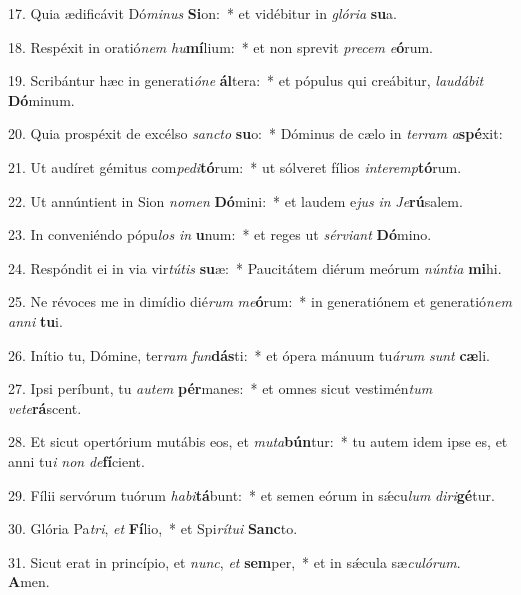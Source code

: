 17. Quia ædificávit Dó\textit{mi}\textit{nus} \textbf{Si}on:~*  et vidébitur in \textit{gló}\textit{ri}\textit{a} \textbf{su}a.\

18. Respéxit in oratió\textit{nem} \textit{hu}\textbf{mí}lium:~*  et non sprevit \textit{pre}\textit{cem} \textit{e}\textbf{ó}rum.\

19. Scribántur hæc in generati\textit{ó}\textit{ne} \textbf{ál}tera:~*  et pópulus qui creábitur, \textit{lau}\textit{dá}\textit{bit} \textbf{Dó}minum.\

20. Quia prospéxit de excélso \textit{sanc}\textit{to} \textbf{su}o:~*  Dóminus de cælo in \textit{ter}\textit{ram} \textit{a}\textbf{spé}xit:\

21. Ut audíret gémitus com\textit{pe}\textit{di}\textbf{tó}rum:~*  ut sólveret fílios \textit{in}\textit{ter}\textit{emp}\textbf{tó}rum.\

22. Ut annúntient in Sion \textit{no}\textit{men} \textbf{Dó}mini:~*  et laudem e\textit{jus} \textit{in} \textit{Je}\textbf{rú}salem.\

23. In conveniéndo pópu\textit{los} \textit{in} \textbf{u}num:~*  et reges ut \textit{sér}\textit{vi}\textit{ant} \textbf{Dó}mino.\

24. Respóndit ei in via vir\textit{tú}\textit{tis} \textbf{su}æ:~*  Paucitátem diérum meórum \textit{nún}\textit{ti}\textit{a} \textbf{mi}hi.\

25. Ne révoces me in dimídio dié\textit{rum} \textit{me}\textbf{ó}rum:~*  in generatiónem et generatió\textit{nem} \textit{an}\textit{ni} \textbf{tu}i.\

26. Inítio tu, Dómine, ter\textit{ram} \textit{fun}\textbf{dás}ti:~*  et ópera mánuum tu\textit{á}\textit{rum} \textit{sunt} \textbf{cæ}li.\

27. Ipsi períbunt, tu \textit{au}\textit{tem} \textbf{pér}manes:~*  et omnes sicut vestimén\textit{tum} \textit{ve}\textit{te}\textbf{rá}scent.\

28. Et sicut opertórium mutábis eos, et \textit{mu}\textit{ta}\textbf{bún}tur:~*  tu autem idem ipse es, et anni tu\textit{i} \textit{non} \textit{de}\textbf{fí}cient.\

29. Fílii servórum tuórum \textit{ha}\textit{bi}\textbf{tá}bunt:~*  et semen eórum in sǽcu\textit{lum} \textit{di}\textit{ri}\textbf{gé}tur.\

30. Glória Pa\textit{tri}, \textit{et} \textbf{Fí}lio,~*  et Spi\textit{rí}\textit{tu}\textit{i} \textbf{Sanc}to.\

31. Sicut erat in princípio, et \textit{nunc}, \textit{et} \textbf{sem}per,~*  et in sǽcula sæ\textit{cu}\textit{ló}\textit{rum}. \textbf{A}men.\

